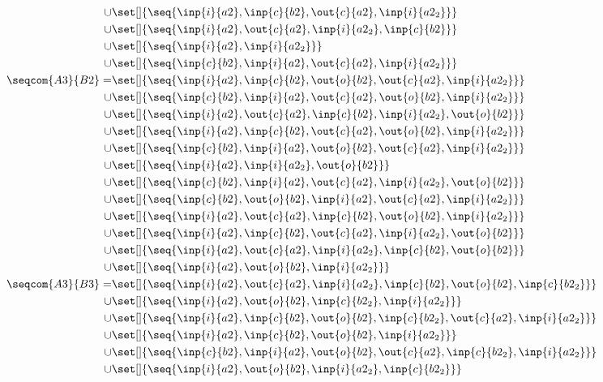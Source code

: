 \begin{align*}
\cup&\set[]{\seq{\inp{i}{a2},\inp{c}{b2},\out{c}{a2},\inp{i}{a2_2}}}\\
\cup&\set[]{\seq{\inp{i}{a2},\out{c}{a2},\inp{i}{a2_2},\inp{c}{b2}}}\\
\cup&\set[]{\seq{\inp{i}{a2},\inp{i}{a2_2}}}\\
\cup&\set[]{\seq{\inp{c}{b2},\inp{i}{a2},\out{c}{a2},\inp{i}{a2_2}}}\\
%
\seqcom{A3}{B2} = &\set[]{\seq{\inp{i}{a2},\inp{c}{b2},\out{o}{b2},\out{c}{a2},\inp{i}{a2_2}}}\\
\cup&\set[]{\seq{\inp{c}{b2},\inp{i}{a2},\out{c}{a2},\out{o}{b2},\inp{i}{a2_2}}}\\
\cup&\set[]{\seq{\inp{i}{a2},\out{c}{a2},\inp{c}{b2},\inp{i}{a2_2},\out{o}{b2}}}\\
\cup&\set[]{\seq{\inp{i}{a2},\inp{c}{b2},\out{c}{a2},\out{o}{b2},\inp{i}{a2_2}}}\\
\cup&\set[]{\seq{\inp{c}{b2},\inp{i}{a2},\out{o}{b2},\out{c}{a2},\inp{i}{a2_2}}}\\
\cup&\set[]{\seq{\inp{i}{a2},\inp{i}{a2_2},\out{o}{b2}}}\\
\cup&\set[]{\seq{\inp{c}{b2},\inp{i}{a2},\out{c}{a2},\inp{i}{a2_2},\out{o}{b2}}}\\
\cup&\set[]{\seq{\inp{c}{b2},\out{o}{b2},\inp{i}{a2},\out{c}{a2},\inp{i}{a2_2}}}\\
\cup&\set[]{\seq{\inp{i}{a2},\out{c}{a2},\inp{c}{b2},\out{o}{b2},\inp{i}{a2_2}}}\\
\cup&\set[]{\seq{\inp{i}{a2},\inp{c}{b2},\out{c}{a2},\inp{i}{a2_2},\out{o}{b2}}}\\
\cup&\set[]{\seq{\inp{i}{a2},\out{c}{a2},\inp{i}{a2_2},\inp{c}{b2},\out{o}{b2}}}\\
\cup&\set[]{\seq{\inp{i}{a2},\out{o}{b2},\inp{i}{a2_2}}}\\
%
\seqcom{A3}{B3} = &\set[]{\seq{\inp{i}{a2},\out{c}{a2},\inp{i}{a2_2},\inp{c}{b2},\out{o}{b2},\inp{c}{b2_2}}}\\
\cup&\set[]{\seq{\inp{i}{a2},\out{o}{b2},\inp{c}{b2_2},\inp{i}{a2_2}}}\\
\cup&\set[]{\seq{\inp{i}{a2},\inp{c}{b2},\out{o}{b2},\inp{c}{b2_2},\out{c}{a2},\inp{i}{a2_2}}}\\
\cup&\set[]{\seq{\inp{i}{a2},\inp{c}{b2},\out{o}{b2},\inp{i}{a2_2}}}\\
\cup&\set[]{\seq{\inp{c}{b2},\inp{i}{a2},\out{o}{b2},\out{c}{a2},\inp{c}{b2_2},\inp{i}{a2_2}}}\\
\cup&\set[]{\seq{\inp{i}{a2},\out{o}{b2},\inp{i}{a2_2},\inp{c}{b2_2}}}\\

\end{align*}
